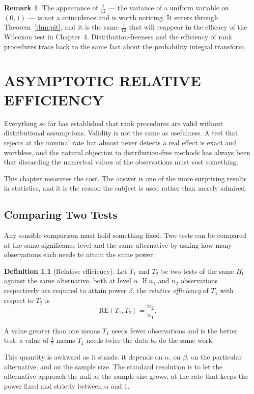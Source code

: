 \documentclass[12pt,a4paper]{report}
\theoremstyle{definition}
\newtheorem{defn}[thm]{Definition}
\newtheorem{remark}[thm]{Remark}
\theoremstyle{plain}
\begin{document}
\begin{remark}
The appearance of $\tfrac{1}{12}$ --- the variance of a uniform variable on
$(0,1)$ --- is not a coincidence and is worth noticing. It enters through
Theorem~\ref{thm:pit}, and it is the same $\tfrac{1}{12}$ that will reappear in
the efficacy of the Wilcoxon test in Chapter~4. Distribution-freeness and the
efficiency of rank procedures trace back to the same fact about the probability
integral transform.
\end{remark}


\chapter{ASYMPTOTIC RELATIVE EFFICIENCY}

Everything so far has established that rank procedures are valid without
distributional assumptions. Validity is not the same as usefulness. A test that
rejects at the nominal rate but almost never detects a real effect is exact and
worthless, and the natural objection to distribution-free methods has always
been that discarding the numerical values of the observations must cost
something.

This chapter measures the cost. The answer is one of the more surprising results
in statistics, and it is the reason the subject is used rather than merely
admired.

\section{Comparing Two Tests}

Any sensible comparison must hold something fixed. Two tests can be compared at
the same significance level and the same alternative by asking how many
observations each needs to attain the same power.

\begin{defn}[Relative efficiency]
Let $T_1$ and $T_2$ be two tests of the same $H_0$ against the same alternative,
both at level $\alpha$. If $n_1$ and $n_2$ observations respectively are
required to attain power $\beta$, the \emph{relative efficiency} of $T_1$ with
respect to $T_2$ is
$$\mathrm{RE}\left(T_1,T_2\right) = \frac{n_2}{n_1}.$$
\end{defn}

A value greater than one means $T_1$ needs fewer observations and is the better
test; a value of $\tfrac12$ means $T_1$ needs twice the data to do the same
work.

This quantity is awkward as it stands: it depends on $\alpha$, on $\beta$, on
the particular alternative, and on the sample size. The standard resolution is
to let the alternative approach the null as the sample size grows, at the rate
that keeps the power fixed and strictly between $\alpha$ and $1$.
\end{document}
